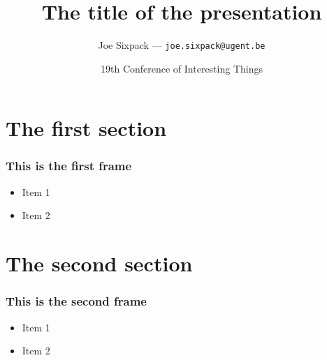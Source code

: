 \documentclass[aspectratio=169]{beamer}
\title{The title of the presentation}
\date{19th Conference of Interesting Things}
\author{Joe Sixpack --- \texttt{joe.sixpack@ugent.be}}
\begin{document}

\titleframe

\section{The first section}

\begin{frame}
    \frametitle{This is the first frame} 
    \begin{itemize}
        \item Item 1
        \item Item 2
    \end{itemize}
\end{frame}

\section{The second section}

\begin{frame}
    \frametitle{This is the second frame} 
    \begin{itemize}
        \item Item 1
        \item Item 2
    \end{itemize}
\end{frame}
\end{document}
